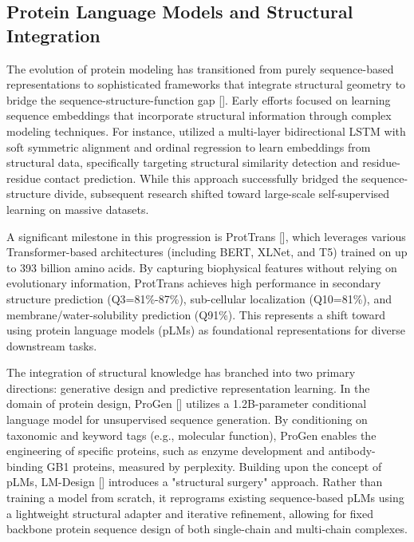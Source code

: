 \documentclass[11pt]{article}
\begin{document}
\subsection{Protein Language Models and Structural Integration}

The evolution of protein modeling has transitioned from purely sequence-based representations to sophisticated frameworks that integrate structural geometry to bridge the sequence-structure-function gap [\citep{2211.16742}]. Early efforts focused on learning sequence embeddings that incorporate structural information through complex modeling techniques. For instance, \citep{1902.08661} utilized a multi-layer bidirectional LSTM with soft symmetric alignment and ordinal regression to learn embeddings from structural data, specifically targeting structural similarity detection and residue-residue contact prediction. While this approach successfully bridged the sequence-structure divide, subsequent research shifted toward large-scale self-supervised learning on massive datasets.

A significant milestone in this progression is ProtTrans [\citep{2007.06225}], which leverages various Transformer-based architectures (including BERT, XLNet, and T5) trained on up to 393 billion amino acids. By capturing biophysical features without relying on evolutionary information, ProtTrans achieves high performance in secondary structure prediction (Q3=81\%-87\%), sub-cellular localization (Q10=81\%), and membrane/water-solubility prediction (Q91\%). This represents a shift toward using protein language models (pLMs) as foundational representations for diverse downstream tasks.

The integration of structural knowledge has branched into two primary directions: generative design and predictive representation learning. In the domain of protein design, ProGen [\citep{2004.03497}] utilizes a 1.2B-parameter conditional language model for unsupervised sequence generation. By conditioning on taxonomic and keyword tags (e.g., molecular function), ProGen enables the engineering of specific proteins, such as enzyme development and antibody-binding GB1 proteins, measured by perplexity. Building upon the concept of pLMs, LM-Design [\citep{2302.01649}] introduces a "structural surgery" approach. Rather than training a model from scratch, it reprograms existing sequence-based pLMs using a lightweight structural adapter and iterative refinement, allowing for fixed backbone protein sequence design of both single-chain and multi-chain complexes.
\end{document}
